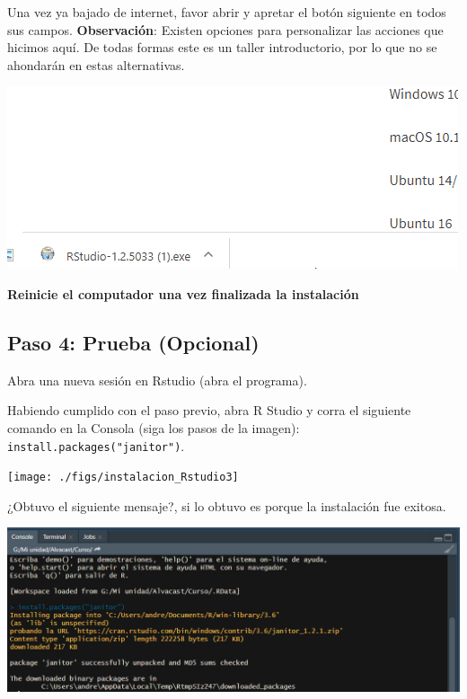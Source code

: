 \documentclass[
]{article}
\begin{document}
Una vez ya bajado de internet, favor abrir y apretar el botón siguiente
en todos sus campos. \textbf{Observación}: Existen opciones para
personalizar las acciones que hicimos aquí. De todas formas este es un
taller introductorio, por lo que no se ahondarán en estas alternativas.

\begin{center}\includegraphics{./figs/instalacion_Rstudio2} \end{center}

\textbf{Reinicie el computador una vez finalizada la instalación}

\hypertarget{paso-4-prueba-opcional}{%
\subsection{Paso 4: Prueba (Opcional)}\label{paso-4-prueba-opcional}}

Abra una nueva sesión en Rstudio (abra el programa).

Habiendo cumplido con el paso previo, abra R Studio y corra el siguiente
comando en la Consola (siga los pasos de la imagen):
\texttt{install.packages("janitor")}.

\begin{center}\texttt{[image: ./figs/instalacion\_Rstudio3]} \end{center}

¿Obtuvo el siguiente mensaje?, si lo obtuvo es porque la instalación fue
exitosa.

\begin{center}\includegraphics[width=14.32in]{./figs/Instalacion_final} \end{center}
\end{document}
